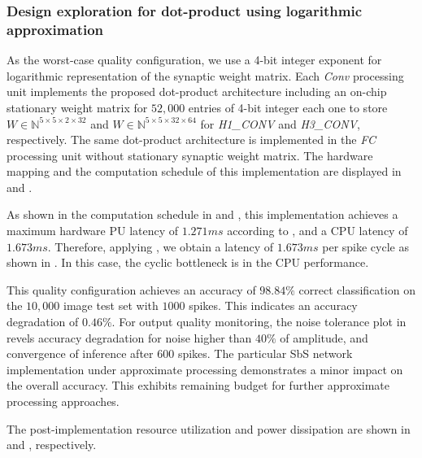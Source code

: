 \subsubsection{Design exploration for dot-product using logarithmic approximation}
As the worst-case quality configuration, we use a 4-bit integer exponent for logarithmic representation of the synaptic weight matrix. Each \emph{Conv} processing unit implements the proposed dot-product architecture including an on-chip stationary weight matrix for $52,000$ entries of 4-bit integer each one to store $W\in\mathbb{N}^{5\times 5\times 2\times 32}$ and $W\in\mathbb{N}^{5\times 5\times 32\times 64}$ for \emph{H1\_CONV} and \emph{H3\_CONV}, respectively. The same dot-product architecture is implemented in the \emph{FC} processing unit without stationary synaptic weight matrix. The hardware mapping and the computation schedule of this implementation are displayed in  and .

As shown in the computation schedule in  and , this implementation achieves a maximum hardware PU latency of $1.271 ms$ according to , and a CPU latency of $1.673 ms$. Therefore, applying , we obtain a latency of $1.673 ms$ per spike cycle as shown in . In this case, the cyclic bottleneck is in the CPU performance.

This quality configuration achieves an accuracy of $98.84\%$ correct classification on the $10,000$ image test set with $1000$ spikes. This indicates an accuracy degradation of $0.46\%$. For output quality monitoring, the noise tolerance plot in  revels accuracy degradation for noise higher than $40\%$ of amplitude, and convergence of inference after $600$ spikes. The particular SbS network implementation under approximate processing demonstrates a minor impact on the overall accuracy. This exhibits remaining budget for further approximate processing approaches.

The post-implementation resource utilization and power dissipation are shown in  and , respectively.

